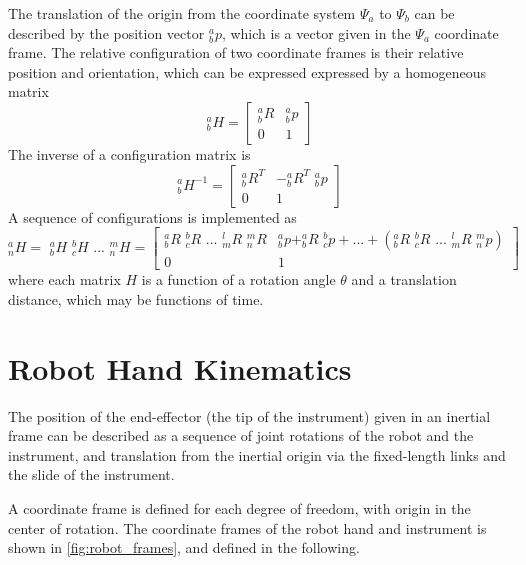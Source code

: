 The translation of the origin from the coordinate system $\Psi_a$ to $\Psi_b$ can be described by the position vector $^a_bp$, which is a vector given in the $\Psi_a$ coordinate frame.
The relative configuration of two coordinate frames is their relative position and orientation, which can be expressed expressed by a homogeneous matrix
\begin{equation}
^a_bH = 
\begin{bmatrix}
^a_bR & ^a_bp\\
0 & 1
\end{bmatrix}
\end{equation}
The inverse of a configuration matrix is
\begin{equation}
^a_bH^{-1} = 
\begin{bmatrix}
^a_bR^T & -^a_bR^T\,\,^a_bp\\
0 & 1
\end{bmatrix}
\end{equation}
A sequence of configurations is implemented as
\begin{equation}
^a_nH =\,\, ^a_bH \,\, ^b_cH \,\,...\,\, ^m_nH = 
\begin{bmatrix}
^a_bR \,\, ^b_cR \,\,...\,\, ^l_mR \,\,^m_nR & ^a_bp + ^a_bR \,\, ^b_cp + ... + (^a_bR\,\, ^b_cR \,\,...\,\, ^l_mR \,\, ^m_np )\\
0 & 1
\end{bmatrix}
\end{equation}
where each matrix $H$ is a function of a rotation angle $\theta$ and a translation distance, which may be functions of time.


 



\section{Robot Hand Kinematics}
The position of the end-effector (the tip of the instrument) given in an inertial frame can be described as a sequence of joint rotations of the robot and the instrument, and translation from the inertial origin via the fixed-length links and the slide of the instrument.

A coordinate frame is defined for each degree of freedom, with origin in the center of rotation. The coordinate frames of the robot hand and instrument is shown in \autoref{fig:robot_frames}, and defined in the following.

